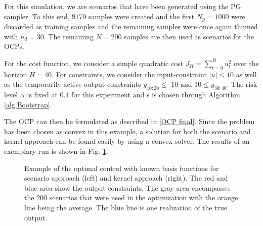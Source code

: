 For this simulation, we are scenarios that have been generated using the PG sampler. To this end, $9170$ samples were created and the first $N_p = 1000$ were discarded as training samples and the remaining samples were once again thinned with $n_d = 30$. The remaining $N = 200$ samples are then used as scenarios for the OCPs.

For the cost function, we consider a simple quadratic cost $J_H = \sum_{t = 0}^H u_t^2$ over the horizon $H = 40$. For constraints, we consider the input-constraint $\left| u \right| \leq 10$ as well as the temporarily active output-constraints $y_{10:20} \leq \text{-} 10$ and $10 \leq y_{30:40}$. The risk level $\alpha$ is fixed at $0.1$ for this experiment and $\epsilon$ is chosen through Algorithm \ref{alg:Bootstrap}.

The OCP can then be formulated as described in \ref{OCP final}. Since the problem has been chosen as convex in this example, a solution for both the scenario and kernel approach can be found easily by using a convex solver. The results of an exemplary run is shown in Fig. \ref{ScenarioKernelComparison}. 

\begin{figure}[htb]
\centering
{}
\quad %
\caption{Example of the optimal control with known basis functions for scenario approach (left) and kernel approach (right). The red and blue area show the output constraints. The gray area encompasses the 200 scenarios that were used in the optimization with the orange line being the average. The blue line is one realization of the true output.}
\label{ScenarioKernelComparison}
\end{figure}

